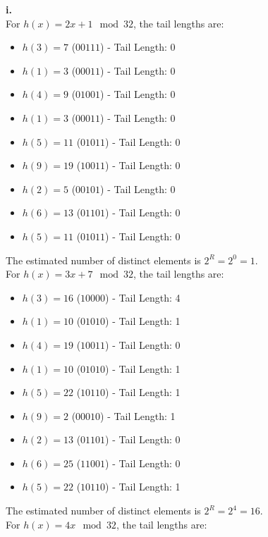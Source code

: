 \documentclass{article}
\begin{document}
\textbf{i.} \\

For \( h(x) = 2x + 1 \mod 32 \), the tail lengths are:

\begin{itemize}
    \item \( h(3) = 7 \) (\(00111\)) - Tail Length: 0
    \item \( h(1) = 3 \) (\(00011\)) - Tail Length: 0
    \item \( h(4) = 9 \) (\(01001\)) - Tail Length: 0
    \item \( h(1) = 3 \) (\(00011\)) - Tail Length: 0
    \item \( h(5) = 11 \) (\(01011\)) - Tail Length: 0
    \item \( h(9) = 19 \) (\(10011\)) - Tail Length: 0
    \item \( h(2) = 5 \) (\(00101\)) - Tail Length: 0
    \item \( h(6) = 13 \) (\(01101\)) - Tail Length: 0
    \item \( h(5) = 11 \) (\(01011\)) - Tail Length: 0
\end{itemize}

The estimated number of distinct elements is \( 2^R = 2^0 = 1 \). \\

For \( h(x) = 3x + 7 \mod 32 \), the tail lengths are:

\begin{itemize}
    \item \( h(3) = 16 \) (\(10000\)) - Tail Length: 4
    \item \( h(1) = 10 \) (\(01010\)) - Tail Length: 1
    \item \( h(4) = 19 \) (\(10011\)) - Tail Length: 0
    \item \( h(1) = 10 \) (\(01010\)) - Tail Length: 1
    \item \( h(5) = 22 \) (\(10110\)) - Tail Length: 1
    \item \( h(9) = 2 \) (\(00010\)) - Tail Length: 1
    \item \( h(2) = 13 \) (\(01101\)) - Tail Length: 0
    \item \( h(6) = 25 \) (\(11001\)) - Tail Length: 0
    \item \( h(5) = 22 \) (\(10110\)) - Tail Length: 1
\end{itemize}

The estimated number of distinct elements is \( 2^R = 2^4 = 16 \). \\

For \( h(x) = 4x \mod 32 \), the tail lengths are:
\end{document}
